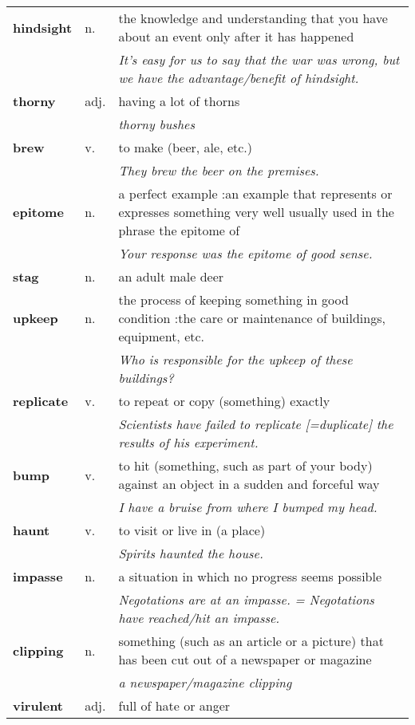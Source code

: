 \documentclass[a4paper]{article}
\begin{document}
\begin{longtable}{llp{11cm}}
\textbf{hindsight} & n. &  the knowledge and understanding that you have about an event only after it has happened \\
 & & \textit{It's easy for us to say that the war was wrong, but we have the advantage/benefit of hindsight.}\\[0.08cm]
\textbf{thorny} & adj. &  having a lot of thorns \\
 & & \textit{thorny bushes}\\[0.08cm]
\textbf{brew} & v. &  to make (beer, ale, etc.) \\
 & & \textit{They brew the beer on the premises.}\\[0.08cm]
\textbf{epitome} & n. &  a perfect example :an example that represents or expresses something very well usually used in the phrase the epitome of \\
 & & \textit{Your response was the epitome of good sense.}\\[0.08cm]
\textbf{stag} & n. &  an adult male deer\\[0.08cm]
\textbf{upkeep} & n. &  the process of keeping something in good condition :the care or maintenance of buildings, equipment, etc. \\
 & & \textit{Who is responsible for the upkeep of these buildings?}\\[0.08cm]
\textbf{replicate} & v. &  to repeat or copy (something) exactly \\
 & & \textit{Scientists have failed to replicate [=duplicate] the results of his experiment.}\\[0.08cm]
\textbf{bump} & v. &  to hit (something, such as part of your body) against an object in a sudden and forceful way \\
 & & \textit{I have a bruise from where I bumped my head.}\\[0.08cm]
\textbf{haunt} & v. &  to visit or live in (a place) \\
 & & \textit{Spirits haunted the house.}\\[0.08cm]
\textbf{impasse} & n. &  a situation in which no progress seems possible \\
 & & \textit{Negotations are at an impasse. = Negotations have reached/hit an impasse.}\\[0.08cm]
\textbf{clipping} & n. &  something (such as an article or a picture) that has been cut out of a newspaper or magazine \\
 & & \textit{a newspaper/magazine clipping}\\[0.08cm]
\textbf{virulent} & adj. &  full of hate or anger \\

\end{longtable}
\end{document}
